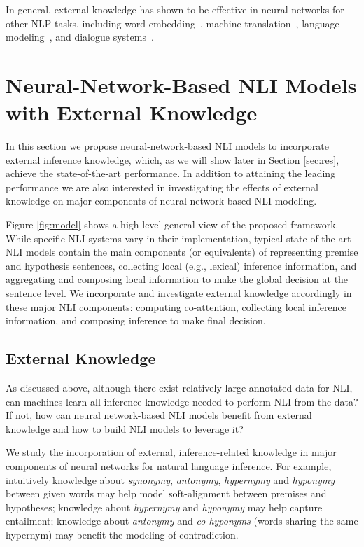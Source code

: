 \documentclass[11pt,a4paper]{article}
\begin{document}
In general, external knowledge has shown to be effective in neural networks for other NLP tasks, including 
word embedding~\citep{DBLP:conf/acl/ChenLCCWJZ15,DBLP:conf/naacl/FaruquiDJDHS15,DBLP:conf/acl/Liu0WLH15,DBLP:journals/tacl/WietingBGL15,DBLP:journals/corr/MrksicVSLRGKY17}, machine translation~\citep{DBLP:conf/acl/ShiLRFLZSW16,DBLP:conf/apsipa/ZhangMWH17}, language modeling~\citep{DBLP:journals/corr/AhnCPB16}, and dialogue systems~\citep{DBLP:journals/corr/ChenHTCGD16}. 

\section{Neural-Network-Based NLI Models with External Knowledge}

In this section we propose neural-network-based NLI models to incorporate external inference knowledge, which, as we will show later in Section \ref{sec:res}, achieve the state-of-the-art performance. In addition to attaining the leading performance we are also interested in investigating the effects of external knowledge on major components of  neural-network-based NLI modeling. 

Figure \ref{fig:model} shows a high-level general view of the proposed framework. While specific NLI systems vary in their implementation, typical state-of-the-art NLI models contain the main components (or equivalents) of representing premise and hypothesis sentences, collecting local (e.g., lexical) inference information, and aggregating and composing local information to make the global decision at the sentence level. We incorporate and investigate external knowledge accordingly in these major NLI components: computing co-attention, collecting local inference information, and composing inference to make final decision.

\subsection{External Knowledge}
\label{sec:knowledge}
As discussed above, although there exist relatively large annotated data for NLI, can machines learn all inference knowledge needed to perform NLI from the data? If not, how can neural network-based NLI models benefit from external knowledge and how to build NLI models to leverage it?

We study the incorporation of external, inference-related knowledge in major components of neural networks for natural language inference. For example, intuitively knowledge about \textit{synonymy}, \textit{antonymy}, \textit{hypernymy} and \textit{hyponymy} between given words may help model soft-alignment between premises and hypotheses; knowledge about \textit{hypernymy} and \textit{hyponymy} may help capture entailment; knowledge about \textit{antonymy} and \textit{co-hyponyms} (words sharing the same hypernym) may benefit the modeling of contradiction. 
\end{document}
